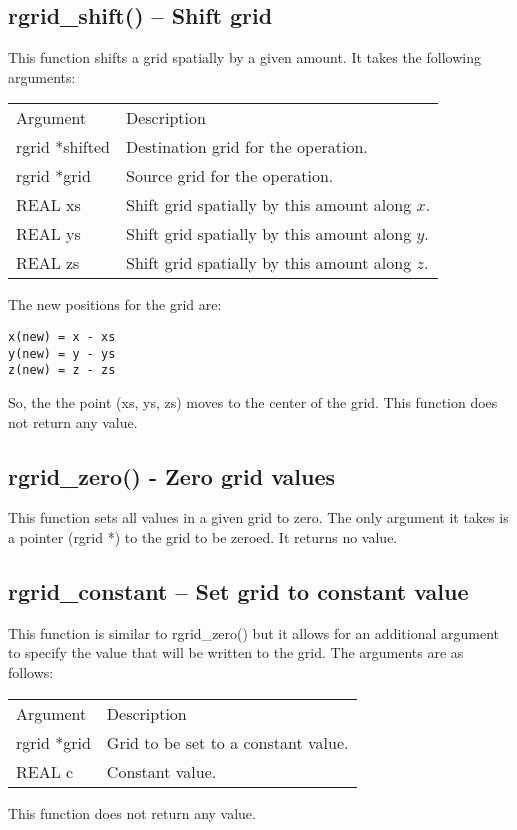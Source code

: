 \documentclass[12pt,letterpaper]{report}
\begin{document}
\subsection{rgrid\_shift() -- Shift grid}

This function shifts a grid spatially by a given amount. It takes the following arguments:
\begin{longtable}{p{} p{}}
Argument & Description\\
\cline{1-2}
rgrid *shifted & Destination grid for the operation.\\
rgrid *grid & Source grid for the operation.\\
REAL xs & Shift grid spatially by this amount along $x$.\\
REAL ys & Shift grid spatially by this amount along $y$.\\
REAL zs & Shift grid spatially by this amount along $z$.\\
\end{longtable}
\noindent
The new positions for the grid are:
\begin{verbatim}
x(new) = x - xs 
y(new) = y - ys 
z(new) = z - zs
\end{verbatim}
\noindent
So, the the point (xs, ys, zs) moves to the center of the grid. This function does not return any value.

\subsection{rgrid\_zero() - Zero grid values}

This function sets all values in a given grid to zero. The only argument it takes is a pointer (rgrid *) to the grid to be zeroed. It returns no value.

\subsection{rgrid\_constant -- Set grid to constant value}

This function is similar to rgrid\_zero() but it allows for an additional argument to specify the value that will be written to the grid. The arguments are as follows:
\begin{longtable}{p{} p{}}
Argument & Description\\
\cline{1-2}
rgrid *grid & Grid to be set to a constant value.\\
REAL c & Constant value.
\end{longtable}
\noindent
This function does not return any value.
\end{document}
